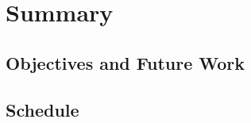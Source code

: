 \chapter{Summary}
\label{chap:final-summary}

\section{Objectives and Future Work}
\label{sec:future-work}

\section{Schedule}
\label{sec:schedule}
